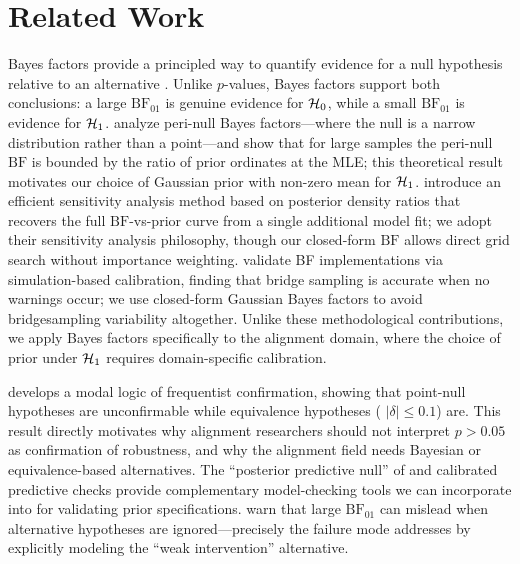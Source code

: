 \section{Related Work}
\label{sec:related}

Bayes factors provide a principled way to quantify evidence for a null hypothesis
relative to an alternative \citep{ly2021bayes}. Unlike $p$-values, Bayes factors
support both conclusions: a large $\mathrm{BF}_{01}$ is genuine evidence for $\mathcal{H}_0$,
while a small $\mathrm{BF}_{01}$ is evidence for $\mathcal{H}_1$. \citet{ly2021bayes} analyze
peri-null Bayes factors---where the null is a narrow distribution rather than a
point---and show that for large samples the peri-null $\mathrm{BF}$ is bounded by the
ratio of prior ordinates at the MLE; this theoretical result motivates our choice of
Gaussian prior with non-zero mean for $\mathcal{H}_1$. \citet{bartos2026efficient} introduce
an efficient sensitivity analysis method based on posterior density ratios that recovers
the full $\mathrm{BF}$-vs-prior curve from a single additional model fit; we adopt
their sensitivity analysis philosophy, though our closed-form $\mathrm{BF}$ allows
direct grid search without importance weighting. \citet{schad2024accurate} validate
BF implementations via simulation-based calibration, finding that bridge sampling is
accurate when no warnings occur; we use closed-form Gaussian Bayes factors to avoid
bridgesampling variability altogether. Unlike these methodological contributions, we
apply Bayes factors specifically to the alignment domain, where the choice of prior
under $\mathcal{H}_1$ requires domain-specific calibration.

\citet{dale2024confirming} develops a modal logic of frequentist confirmation, showing
that point-null hypotheses are unconfirmable while equivalence hypotheses (\eg
$|\delta| \leq 0.1$) are. This result directly motivates why alignment researchers
should not interpret $p > 0.05$ as confirmation of robustness, and why the alignment
field needs Bayesian or equivalence-based alternatives. The ``posterior predictive
null'' of \citet{zacco2021ppn} and calibrated predictive checks \citep{vehtari2022split}
provide complementary model-checking tools we can incorporate into \ours for
validating prior specifications. \citet{good1983null} warn that large $\mathrm{BF}_{01}$
can mislead when alternative hypotheses are ignored---precisely the failure mode \ours
addresses by explicitly modeling the ``weak intervention'' alternative.

